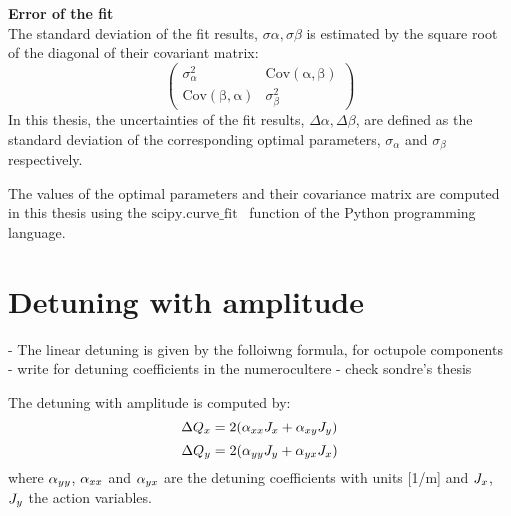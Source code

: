 \normalsize{\textbf{Error of the fit}}\\
The standard deviation of the fit results, $\sigma \alpha, \sigma \beta$ is estimated by the square root of the diagonal of their covariant matrix:
\begin{equation}\label{eq:cov_matrix_fit_results}
    \begin{pmatrix}
        \sigma_{\alpha}^2 & \mathrm{Cov(\alpha, \beta)}\\
        \mathrm{Cov(\beta, \alpha)} & \sigma_{\beta}^2
        \end{pmatrix}
\end{equation}
In this thesis, the uncertainties of the fit results, $\Delta \alpha, \Delta \beta$, are defined as the standard deviation of the corresponding optimal parameters, $\sigma_{\alpha}$ and  $\sigma_{\beta}$ respectively.

The values of the optimal parameters and their covariance matrix are computed in this thesis using the $\mathrm{scipy.curve \_ fit}$~\cite{scipy_curve_fit} function of the Python programming language.


\section{Detuning with amplitude}\label{app:detuning_with_amplitude}
- The linear detuning is given by the folloiwng formula, for octupole components
- write for detuning coefficients in the numerocultere
- check sondre's thesis

The detuning with amplitude is computed by:
\begin{equation}\label{eq:x_amplDetuning}
    \Delta Q_x = 2({\alpha_{xx}} {J_x} + \alpha_{xy} {J_y})
\end{equation}
\begin{equation}\label{eq:y_amplDetuning}
    \Delta Q_y = 2({\alpha_{yy}} {J_y} + \alpha_{yx} {J_x})
\end{equation}
where ${\alpha_{yy}}$, ${\alpha_{xx}}$ and ${\alpha_{yx}}$ are the detuning coefficients with units [1/m] and ${J_x}$, ${J_y}$ the action variables.


